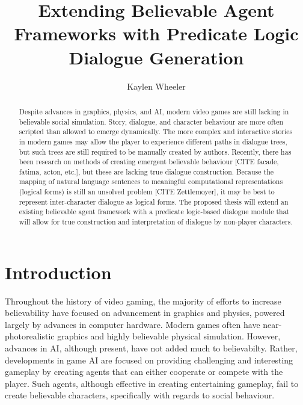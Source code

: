 \documentclass{article}
\begin{document}
\title{Extending Believable Agent Frameworks with Predicate
  Logic Dialogue Generation}
\author{Kaylen Wheeler}

\maketitle

\begin{abstract}

Despite advances in graphics, physics, and AI, modern video games are
still lacking in believable social simulation.  Story, dialogue, and
character behaviour are more often scripted than allowed to emerge
dynamically.  The more complex and interactive stories in modern games
may allow the player to experience different paths in dialogue trees,
but such trees are still required to be manually created by authors.
Recently, there has been research on methods of creating emergent
believable behaviour [CITE facade, fatima, acton, etc.], but these are
lacking true dialogue construction.  Because the mapping of natural
language sentences to meaningful computational representations
(logical forms) is still an unsolved problem [CITE Zettlemoyer], it
may be best to represent inter-character dialogue as logical forms.
The proposed thesis will extend an existing believable agent
framework with a predicate logic-based dialogue module that will
allow for true construction and interpretation of dialogue by
non-player characters.

\end{abstract}

\section{Introduction}

Throughout the history of video gaming, the majority of efforts to
increase believability have focused on advancement in graphics and
physics, powered largely by advances in computer hardware.  Modern
games often have near-photorealistic graphics and highly believable
physical simulation.  However, advances in AI, although present, have
not added much to believabilty.  Rather, developments in game AI are
focused on providing challenging and interesting gameplay by creating
agents that can either cooperate or compete with the player.  Such
agents, although effective in creating entertaining gameplay, fail to
create believable characters, specifically with regards to social
behaviour.
\end{document}

